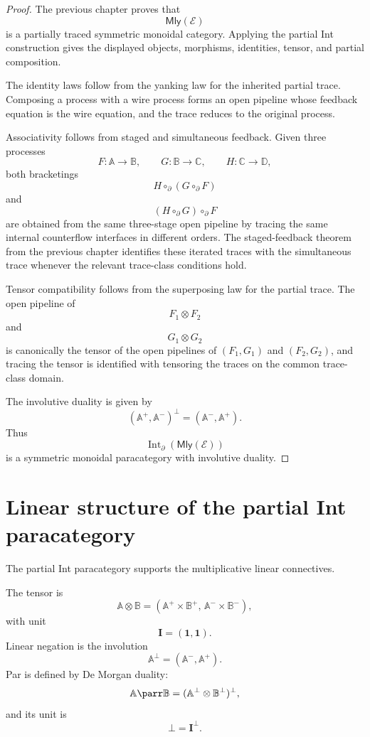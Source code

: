 \begin{proof}
The previous chapter proves that
\[
\mathsf{Mly}(\mathcal E)
\]
is a partially traced symmetric monoidal category.  Applying the partial Int
construction gives the displayed objects, morphisms, identities, tensor, and
partial composition.

The identity laws follow from the yanking law for the inherited partial trace.
Composing a process with a wire process forms an open pipeline whose feedback
equation is the wire equation, and the trace reduces to the original process.

Associativity follows from staged and simultaneous feedback.  Given three
processes
\[
F:\mathbb A\to\mathbb B,
\qquad
G:\mathbb B\to\mathbb C,
\qquad
H:\mathbb C\to\mathbb D,
\]
both bracketings
\[
H\circ_{\partial}(G\circ_{\partial}F)
\]
and
\[
(H\circ_{\partial}G)\circ_{\partial}F
\]
are obtained from the same three-stage open pipeline by tracing the same
internal counterflow interfaces in different orders.  The staged-feedback
theorem from the previous chapter identifies these iterated traces with the
simultaneous trace whenever the relevant trace-class conditions hold.

Tensor compatibility follows from the superposing law for the partial trace.
The open pipeline of
\[
F_1\otimes F_2
\]
and
\[
G_1\otimes G_2
\]
is canonically the tensor of the open pipelines of \((F_1,G_1)\) and
\((F_2,G_2)\), and tracing the tensor is identified with tensoring the traces
on the common trace-class domain.

The involutive duality is given by
\[
(\mathbb A^+,\mathbb A^-)^\bot=(\mathbb A^-,\mathbb A^+).
\]
Thus
\[
\operatorname{Int}_{\partial}(\mathsf{Mly}(\mathcal E))
\]
is a symmetric monoidal paracategory with involutive duality.
\end{proof}

\section{Linear structure of the partial Int paracategory}
\label{sec:linear-structure-partial-int}

The partial Int paracategory supports the multiplicative linear connectives.

The tensor is
\[
\mathbb A\otimes\mathbb B
=
(\mathbb A^+\times\mathbb B^+,\,
 \mathbb A^-\times\mathbb B^-),
\]
with unit
\[
\mathbf I=(\mathbf 1,\mathbf 1).
\]
Linear negation is the involution
\[
\mathbb A^\bot=(\mathbb A^-,\mathbb A^+).
\]
Par is defined by De Morgan duality:
\[
\mathbb A\parr\mathbb B
=
(\mathbb A^\bot\otimes\mathbb B^\bot)^\bot,
\]
and its unit is
\[
\bot=\mathbf I^\bot.
\]

